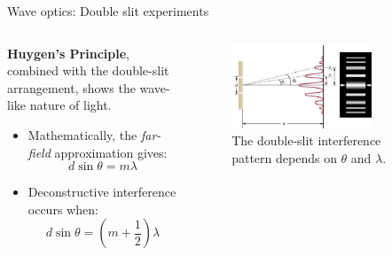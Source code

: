 \documentclass{beamer}
\begin{document}
\begin{frame}{Wave optics: Double slit experiments}
\begin{columns}[T]
\begin{column}{0.5\textwidth}
\small
\textbf{\alert{Huygen's Principle}}, combined with the double-slit arrangement, shows the wave-like nature of light.
\begin{itemize}
    \item Mathematically, the \textit{far-field} approximation gives:
    \begin{equation}
        d\sin\theta = m\lambda
    \end{equation}
    \item Deconstructive interference occurs when:
    \begin{equation}
        d\sin\theta = \left(m + \frac{1}{2}\right)\lambda
    \end{equation}
\end{itemize}
\end{column}
\begin{column}{0.5\textwidth}
\footnotesize
\begin{figure}
\centering
\includegraphics[width=0.75\textwidth]{figures/slit6.png}
\caption{\label{fig:slit5} \footnotesize The double-slit interference pattern depends on $\theta$ and $\lambda$.}
\end{figure}
\end{column}
\end{columns}
\end{frame}
\end{document}
